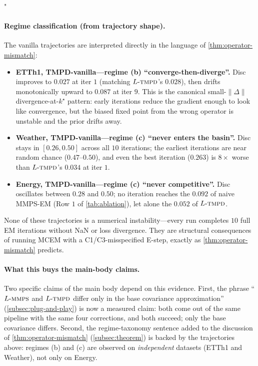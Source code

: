 "\documentclass{article}
\theoremstyle{plain}
\theoremstyle{definition}
\theoremstyle{remark}
\newcommand{\lmmps}{L\mbox{-}\textsc{mmps}}
\newcommand{\ltmpd}{L\mbox{-}\textsc{tmpd}}
\begin{document}
\paragraph{Regime classification (from trajectory shape).}
The vanilla trajectories are interpreted directly in the language of \cref{thm:operator-mismatch}:
\begin{itemize}
\setlength{\itemsep}{0pt}
\item \textbf{ETTh1, TMPD-vanilla---regime (b) ``converge-then-diverge''.} Disc improves to $0.027$ at iter $1$ (matching $\ltmpd$'s $0.028$), then drifts monotonically upward to $0.087$ at iter $9$. This is the canonical small-$\|\Delta\|$ divergence-at-$k^\star$ pattern: early iterations reduce the gradient enough to look like convergence, but the biased fixed point from the wrong operator is unstable and the prior drifts away.
\item \textbf{Weather, TMPD-vanilla---regime (c) ``never enters the basin''.} Disc stays in $[0.26, 0.50]$ across all $10$ iterations; the earliest iterations are near random chance ($0.47$--$0.50$), and even the best iteration ($0.263$) is $8\times$ worse than $\ltmpd$'s $0.034$ at iter $1$.
\item \textbf{Energy, TMPD-vanilla---regime (c) ``never competitive''.} Disc oscillates between $0.28$ and $0.50$; no iteration reaches the $0.092$ of naive MMPS-EM (Row $1$ of \cref{tab:ablation}), let alone the $0.052$ of $\ltmpd$.
\end{itemize}
None of these trajectories is a numerical instability---every run completes $10$ full EM iterations without NaN or loss divergence. They are structural consequences of running MCEM with a C1/C3-misspecified E-step, exactly as \cref{thm:operator-mismatch} predicts.

\paragraph{What this buys the main-body claims.}
Two specific claims of the main body depend on this evidence. First, the phrase ``$\lmmps$ and $\ltmpd$ differ only in the base covariance approximation'' (\cref{subsec:plug-and-play}) is now a measured claim: both come out of the same pipeline with the same four corrections, and both succeed; only the base covariance differs. Second, the regime-taxonomy sentence added to the discussion of \cref{thm:operator-mismatch} (\cref{subsec:theorem}) is backed by the trajectories above: regimes (b) and (c) are observed on \emph{independent} datasets (ETTh1 and Weather), not only on Energy.
\end{document}
